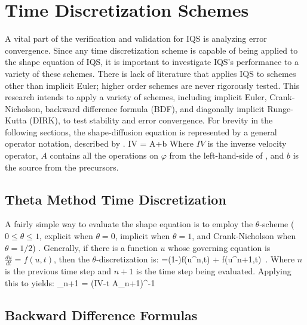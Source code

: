 \section{Time Discretization Schemes}
\label{sect:dt}

A vital part of the verification and validation for IQS is analyzing error convergence.  Since any time discretization scheme is capable of being applied to the shape equation of IQS, it is important to investigate IQS's performance to a variety of these schemes.  There is lack of literature that applies IQS to schemes other than implicit Euler; higher order schemes are never rigorously tested.  This research intends to apply a variety of schemes, including implicit Euler, Crank-Nicholson, backward difference formula (BDF), and diagonally implicit Runge-Kutta (DIRK), to test stability and error convergence.  For brevity in the following sections, the shape-diffusion equation is represented by a general operator notation, described by .
\be 
IV = A\varphi+b
\label{eq:shape_mat}
\ee
Where $IV$ is the inverse velocity operator, $A$ contains all the operations on $\varphi$ from the left-hand-side of , and $b$ is the source from the precursors. 

\subsection{Theta Method Time Discretization}
\label{sect:theta}

A fairly simple way to evaluate the shape equation is to employ the $\theta$-scheme ($0\le\theta\le1$, explicit when $\theta=0$, implicit when $\theta=1$, and Crank-Nicholson when $\theta=1/2$) \cite{Ferziger}.  Generally, if there is a function $u$ whose governing equation is $\frac{du}{dt}=f(u,t)$, then the $\theta$-discretization is:
\be
{}=(1-\theta)f(u^n,t) + \theta f(u^{n+1},t) \,.
\ee
Where $n$ is the previous time step and $n+1$ is the time step being evaluated. Applying this to  yields:
\be
\varphi_{n+1} = (IV-\Delta t A_{n+1})^{-1}
\ee

\subsection{Backward Difference Formulas}


